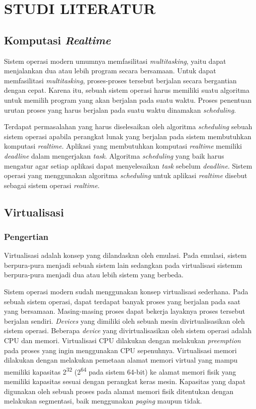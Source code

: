 \chapter{STUDI LITERATUR}

\section{Komputasi \textit{Realtime}}

Sistem operasi modern umumnya memfasilitasi \textit{multitasking}, yaitu dapat menjalankan dua atau lebih program secara
bersamaan. Untuk dapat memfasilitasi \textit{multitasking}, proses-proses tersebut berjalan secara bergantian dengan
cepat. Karena itu, sebuah sistem operasi harus memiliki suatu algoritma untuk memilih program yang akan berjalan pada
suatu waktu. Proses penentuan urutan proses yang harus berjalan pada suatu waktu dinamakan \textit{scheduling}.

Terdapat permasalahan yang harus diselesaikan oleh algoritma \textit{scheduling} sebuah sistem operasi apabila perangkat
lunak yang berjalan pada sistem membutuhkan komputasi \textit{realtime}. Aplikasi yang membutuhkan komputasi
\textit{realtime} memiliki \textit{deadline} dalam mengerjakan \textit{task}. Algoritma \textit{scheduling} yang baik
harus mengatur agar setiap aplikasi dapat menyelesaikan \textit{task} sebelum \textit{deadline}. Sistem operasi yang
menggunakan algoritma \textit{scheduling} untuk aplikasi \textit{realtime} disebut sebagai sistem operasi
\textit{realtime}.

\section{Virtualisasi}

\subsection{Pengertian}

Virtualisasi adalah konsep yang dilandaskan oleh emulasi. Pada emulasi, sistem berpura-pura menjadi sebuah sistem lain
sedangkan pada virtualisasi sistemm berpura-pura menjadi dua atau lebih sistem yang berbeda.

Sistem operasi modern sudah menggunakan konsep virtualisasi sederhana. Pada sebuah sistem operasi, dapat terdapat banyak
proses yang berjalan pada saat yang bersamaan. Masing-masing proses dapat bekerja layaknya proses tersebut berjalan
sendiri. \textit{Devices} yang dimiliki oleh sebuah mesin divirtualisasikan oleh sistem operasi. Beberapa
\textit{device} yang divirtualisasikan oleh sistem operasi adalah CPU dan memori. Virtualisasi CPU dilakukan dengan
melakukan \textit{preemption} pada proses yang ingin menggunakan CPU sepenuhnya. Virtualisasi memori dilakukan dengan
melakukan pemetaan alamat memori virtual yang mampu memiliki kapasitas 2\textsuperscript{32} (2\textsuperscript{64} pada
sistem 64-bit) ke alamat memori fisik yang memiliki kapasitas sesuai dengan perangkat keras mesin.  Kapasitas yang dapat
digunakan oleh sebuah proses pada alamat memori fisik ditentukan dengan melakukan segmentasi, baik menggunakan
\textit{paging} maupun tidak.

